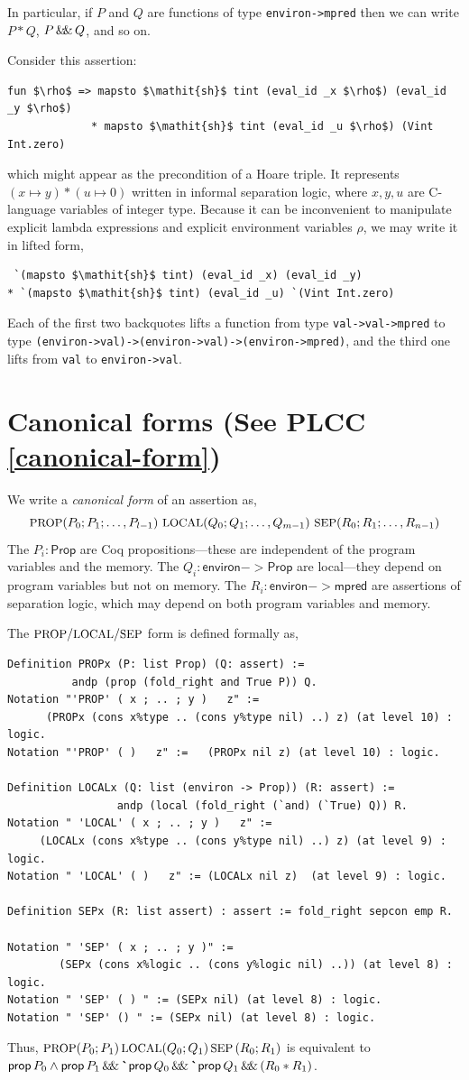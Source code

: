 \documentclass[12pt,fleqn,openany,oneside,showtrims]{memoir}
\newcommand{\ychapter}[2]{\chapter[#1]{#1 \hfill \normalsize #2}}
\begin{document}
In particular, if $P$ and $Q$ are functions of type \lstinline{environ->mpred}
then we can write $P*Q$,  $P \,\mathsf{\&\hspace{-.2em}\&}\, Q$, and so on.

Consider this assertion:
\begin{lstlisting}
fun $\rho$ => mapsto $\mathit{sh}$ tint (eval_id _x $\rho$) (eval_id _y $\rho$) 
             * mapsto $\mathit{sh}$ tint (eval_id _u $\rho$) (Vint Int.zero)
\end{lstlisting}
which might appear as the precondition of a Hoare triple.
It represents $(x\mapsto y) *(u\mapsto 0)$ written in informal
separation logic, where $x,y,u$ are C-language variables
of integer type.
Because it can be inconvenient to manipulate explicit lambda expressions
and explicit environment variables $\rho$, we may write it in lifted
form,
\begin{lstlisting}
 `(mapsto $\mathit{sh}$ tint) (eval_id _x) (eval_id _y) 
* `(mapsto $\mathit{sh}$ tint) (eval_id _u) `(Vint Int.zero)
\end{lstlisting}
Each of the first two backquotes lifts a function
from type \lstinline{val->val->mpred} to type
\lstinline{(environ->val)->(environ->val)->(environ->mpred)},
and the third one lifts from \lstinline{val} to 
\lstinline{environ->val}.

\ychapter{Canonical forms}{(See PLCC \autoref{canonical-form})}
We write a \emph{canonical form} of an assertion as,
\[
\mbox{\small PROP}(P_0;P_1;\ldots,P_{l-1})~
\mbox{\small LOCAL}(Q_0;Q_1;\ldots,Q_{m-1})~
\mbox{\small SEP}(R_0;R_1;\ldots,R_{n-1})
\]
The $P_i : \mathsf{Prop}$ are Coq propositions---these are independent
of the program variables and the memory.
The $Q_i : \mathsf{environ}->\mathsf{Prop}$ are local---they depend on 
program variables but not on memory.
The $R_i: \mathsf{environ}->\mathsf{mpred}$ are 
assertions of separation logic,
which may depend on both program variables and memory.

The $\mbox{\small PROP}/\mbox{\small LOCAL}/\mbox{\small SEP}$ form is defined formally as,
\begin{lstlisting}
Definition PROPx (P: list Prop) (Q: assert) := 
          andp (prop (fold_right and True P)) Q.
Notation "'PROP' ( x ; .. ; y )   z" := 
      (PROPx (cons x%type .. (cons y%type nil) ..) z) (at level 10) : logic.
Notation "'PROP' ( )   z" :=   (PROPx nil z) (at level 10) : logic.

Definition LOCALx (Q: list (environ -> Prop)) (R: assert) := 
                 andp (local (fold_right (`and) (`True) Q)) R.
Notation " 'LOCAL' ( x ; .. ; y )   z" := 
     (LOCALx (cons x%type .. (cons y%type nil) ..) z) (at level 9) : logic.
Notation " 'LOCAL' ( )   z" := (LOCALx nil z)  (at level 9) : logic.

Definition SEPx (R: list assert) : assert := fold_right sepcon emp R.

Notation " 'SEP' ( x ; .. ; y )" := 
        (SEPx (cons x%logic .. (cons y%logic nil) ..)) (at level 8) : logic.
Notation " 'SEP' ( ) " := (SEPx nil) (at level 8) : logic.
Notation " 'SEP' () " := (SEPx nil) (at level 8) : logic.
\end{lstlisting}
Thus, 
$\mbox{\small PROP} (P_0;P_1)\,\mbox{\small LOCAL}(Q_0;Q_1)\,\mbox{\small SEP}\,(R_0;R_1)$
is equivalent to 
$\mathsf{prop}\,P_0\wedge \mathsf{prop}\,P_1 \,\mathsf{\&\hspace{-.2em}\&}\,
\mbox{\textbf{\`{}}}\mathsf{prop}\,Q_0 \,\mathsf{\&\hspace{-.2em}\&}\, \mbox{\textbf{\`{}}}\mathsf{prop}\,Q_1 \,\mathsf{\&\hspace{-.2em}\&}\,
(R_0 * R_1)$.
\end{document}
